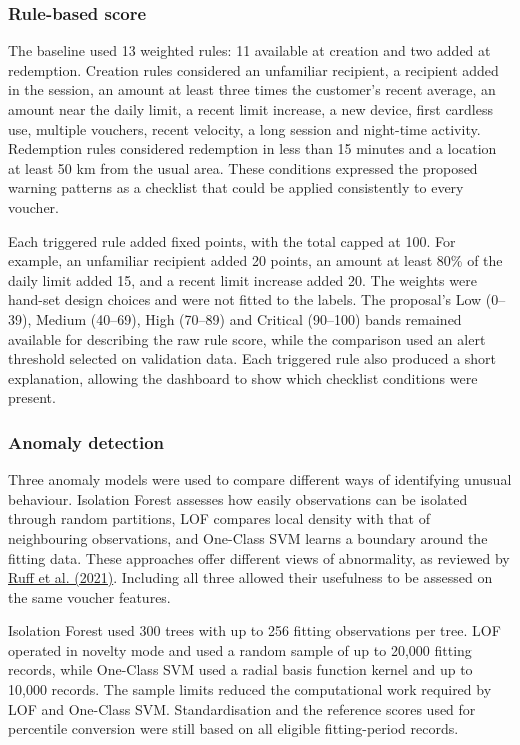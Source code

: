\documentclass[11pt,a4paper]{article}
\begin{document}
\subsubsection*{Rule-based score}

The baseline used 13 weighted rules: 11 available at creation and two added at redemption. Creation rules considered an unfamiliar recipient, a recipient added in the session, an amount at least three times the customer's recent average, an amount near the daily limit, a recent limit increase, a new device, first cardless use, multiple vouchers, recent velocity, a long session and night-time activity. Redemption rules considered redemption in less than 15 minutes and a location at least 50 km from the usual area. These conditions expressed the proposed warning patterns as a checklist that could be applied consistently to every voucher.

Each triggered rule added fixed points, with the total capped at 100. For example, an unfamiliar recipient added 20 points, an amount at least 80\% of the daily limit added 15, and a recent limit increase added 20. The weights were hand-set design choices and were not fitted to the labels. The proposal's Low (0--39), Medium (40--69), High (70--89) and Critical (90--100) bands remained available for describing the raw rule score, while the comparison used an alert threshold selected on validation data. Each triggered rule also produced a short explanation, allowing the dashboard to show which checklist conditions were present.

\subsubsection*{Anomaly detection}

Three anomaly models were used to compare different ways of identifying unusual behaviour. Isolation Forest assesses how easily observations can be isolated through random partitions, LOF compares local density with that of neighbouring observations, and One-Class SVM learns a boundary around the fitting data. These approaches offer different views of abnormality, as reviewed by \href{https://doi.org/10.1109/JPROC.2021.3052449}{Ruff et al. (2021)}. Including all three allowed their usefulness to be assessed on the same voucher features.

Isolation Forest used 300 trees with up to 256 fitting observations per tree. LOF operated in novelty mode and used a random sample of up to 20,000 fitting records, while One-Class SVM used a radial basis function kernel and up to 10,000 records. The sample limits reduced the computational work required by LOF and One-Class SVM. Standardisation and the reference scores used for percentile conversion were still based on all eligible fitting-period records.
\end{document}
